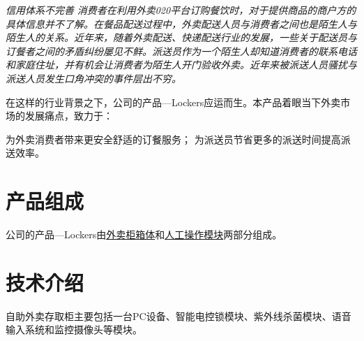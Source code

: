 \documentclass[violet]{main}
\begin{document}
			\begin{weakness}{\it 信用体系不完善}{}
				\it 消费者在利用外卖020平台订购餐饮时，对于提供商品的商户方的具体信息并不了解。在餐品配送过程中，外卖配送人员与消费者之间也是陌生人与陌生人的关系。近年来，随着外卖配送、快递配送行业的发展，一些关于配送员与订餐者之间的矛盾纠纷屡见不鲜。派送员作为一个陌生人却知道消费者的联系电话和家庭住址，并有机会让消费者为陌生人开门验收外卖。近年来被派送人员骚扰与派送人员发生口角冲突的事件层出不穷。
			\end{weakness}
			在这样的行业背景之下，公司的产品---Lockers应运而生。本产品着眼当下外卖市场的发展痛点，致力于：
			\begin{center}
				\begin{tcolorbox}[title = {发展目标}]
					为外卖消费者带来更安全舒适的订餐服务；
					\tcblower
					为派送员节省更多的派送时间提高派送效率。
				\end{tcolorbox}
			\end{center}
		\section{产品组成}
			公司的产品---Lockers由\hyperlink{外卖柜箱体}{外卖柜箱体}和\hyperlink{人工操作模块}{人工操作模块}两部分组成。
			\begin{center}
				\Tcbset{}
			\end{center}
			\begin{center}
				\Tcbset{}
			\end{center}
		\section{技术介绍}
			自助外卖存取柜主要包括一台PC设备、智能电控锁模块、紫外线杀菌模块、语音输入系统和监控摄像头等模块。
			\begin{center}
				\Mindmap
			\end{center}
			\begin{center}
				\Flowchart
			\end{center}
\end{document}
